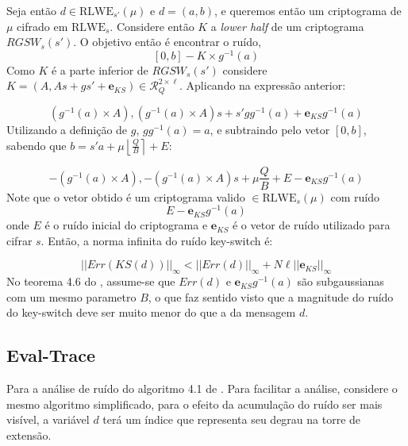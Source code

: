 Seja então $d \in \text{RLWE}_{s'}(\mu)$ e $d = (a, b)$, e queremos então um criptograma de $\mu$ cifrado em $\text{RLWE}_{s}$.
Considere então $K$ a \textit{lower half} de um criptograma $RGSW_s(s')$. O objetivo então é encontrar o ruído,
$$
[0,b] - K \times g^{-1}(a)
$$
Como $K$ é a parte inferior de $RGSW_s(s')$ considere $K = (A, As + gs' + \mathbf{e}_{KS}) \in \mathcal{R}_Q^{2 \times \ell}$. Aplicando na expressão anterior:  

$$
(g^{-1}(a) \times A),  (g^{-1}(a) \times A) s + s' g g^{-1}(a) + \mathbf{e}_{KS} g^{-1}(a)
$$
Utilizando a definição de $g$, $g g^{-1}(a) = a$, e subtraindo pelo vetor $[0, b]$, sabendo que $b = s'a + \mu \left\lfloor \frac{Q}{B} \right\rceil + E$:

$$
-(g^{-1}(a) \times A), -(g^{-1}(a) \times A) s + \mu \frac{Q}{B} + E - \mathbf{e}_{KS} g^{-1}(a)
$$
Note que o vetor obtido é um criptograma valido $\in \text{RLWE}_{s}(\mu)$ com ruído 
$$E - \mathbf{e}_{KS} g^{-1}(a)$$
onde $E$ é o ruído inicial do criptograma e $\mathbf{e}_{KS}$ é o vetor de ruído utilizado para cifrar $s$. Então, a norma infinita 
do ruído key-switch é: 

$$
||Err(KS(d))||_\infty < ||Err(d)||_\infty + N\ell ||\mathbf{e}_{KS}||_\infty
$$
No teorema 4.6 do \cite{lw23I}, assume-se que $Err(d)$ e $\mathbf{e}_{KS} g^{-1}(a)$ são subgaussianas com um mesmo parametro $B$, o que faz sentido 
visto que a magnitude do ruído do key-switch deve ser muito menor do que a da mensagem $d$.

\subsection{Eval-Trace}

Para a análise de ruído do algoritmo 4.1 de \cite{lw23I}. Para facilitar a análise, considere o mesmo
algoritmo simplificado, para o efeito da acumulação do ruído ser mais visível, a variável $d$ terá um 
índice que representa seu degrau na torre de extensão. 

